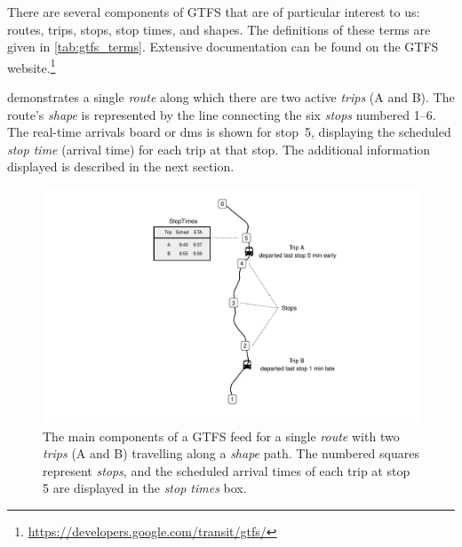 There are several components of GTFS that are of particular interest to us: routes, trips, stops, stop times, and shapes. The definitions of these terms are given in \cref{tab:gtfs_terms}. Extensive documentation can be found on the GTFS website.\footnote{\url{https://developers.google.com/transit/gtfs/}}


 demonstrates a single \emph{route} along which there are two active \emph{trips} (A and B). The route's \emph{shape} is represented by the line connecting the six \emph{stops} numbered 1--6. The real-time arrivals board or \gls{dms} is shown for stop~5, displaying the scheduled \emph{stop time} (arrival time) for each trip at that stop. The additional information displayed is described in the next section.



\begin{knitrout}\small
{}\color{fgcolor}\begin{figure}

{\centering \includegraphics[width=\textwidth]{figure/gtfs_nw-1} 

}

\caption[The main components of a GTFS feed]{The main components of a GTFS feed for a single \emph{route} with two \emph{trips} (A and B) travelling along a \emph{shape} path. The numbered squares represent \emph{stops}, and the scheduled arrival times of each trip at stop 5 are displayed in the \emph{stop times} box.}\label{fig:gtfs_nw}
\end{figure}


\end{knitrout}



